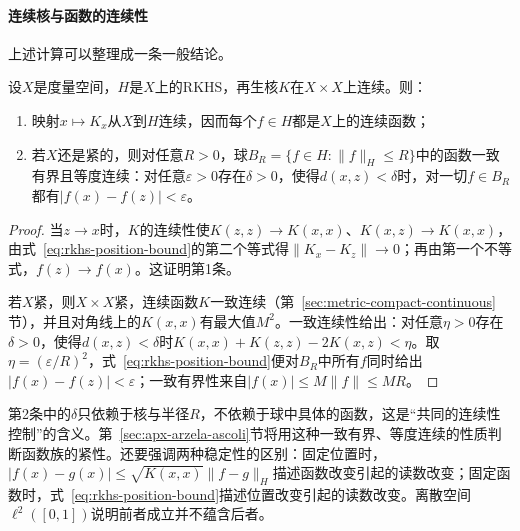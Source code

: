 \paragraph{连续核与函数的连续性}

上述计算可以整理成一条一般结论。

\begin{theorem}[连续核给出连续函数]
\label{thm:rkhs-continuity}
设$X$是度量空间，$H$是$X$上的RKHS，再生核$K$在$X\times X$上连续。则：
\begin{enumerate}
\item 映射$x\mapsto K_x$从$X$到$H$连续，因而每个$f\in H$都是$X$上的连续函数；
\item 若$X$还是紧的，则对任意$R>0$，球$B_R=\{f\in H:\|f\|_H\le R\}$中的函数一致有界且等度连续：对任意$\varepsilon>0$存在$\delta>0$，使得$d(x,z)<\delta$时，对一切$f\in B_R$都有$|f(x)-f(z)|<\varepsilon$。
\end{enumerate}
\end{theorem}

\begin{proof}
当$z\to x$时，$K$的连续性使$K(z,z)\to K(x,x)$、$K(x,z)\to K(x,x)$，由式~\eqref{eq:rkhs-position-bound}的第二个等式得$\|K_x-K_z\|\to0$；再由第一个不等式，$f(z)\to f(x)$。这证明第1条。

若$X$紧，则$X\times X$紧，连续函数$K$一致连续（第~\ref{sec:metric-compact-continuous}节），并且对角线上的$K(x,x)$有最大值$M^2$。一致连续性给出：对任意$\eta>0$存在$\delta>0$，使得$d(x,z)<\delta$时$K(x,x)+K(z,z)-2K(x,z)<\eta$。取$\eta=(\varepsilon/R)^2$，式~\eqref{eq:rkhs-position-bound}便对$B_R$中所有$f$同时给出$|f(x)-f(z)|<\varepsilon$；一致有界性来自$|f(x)|\le M\|f\|\le MR$。
\end{proof}

第2条中的$\delta$只依赖于核与半径$R$，不依赖于球中具体的函数，这是“共同的连续性控制”的含义。第~\ref{sec:apx-arzela-ascoli}节将用这种一致有界、等度连续的性质判断函数族的紧性。还要强调两种稳定性的区别：固定位置时，$|f(x)-g(x)|\le\sqrt{K(x,x)}\|f-g\|_H$描述函数改变引起的读数改变；固定函数时，式~\eqref{eq:rkhs-position-bound}描述位置改变引起的读数改变。离散空间$\ell^2([0,1])$说明前者成立并不蕴含后者。

